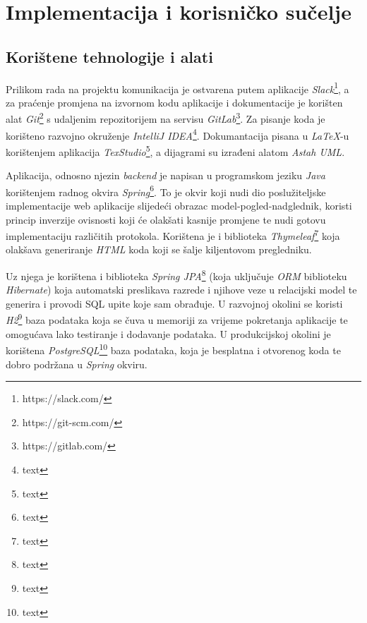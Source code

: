\chapter{Implementacija i korisničko sučelje}
		
		
		\section{Korištene tehnologije i alati}
%		
%			

		
		Prilikom rada na projektu komunikacija je ostvarena putem aplikacije \textit{Slack}\footnote{https://slack.com/}, a za praćenje promjena na izvornom kodu aplikacije i dokumentacije je korišten alat \textit{Git}\footnote{https://git-scm.com/} s udaljenim repozitorijem na servisu \textit{GitLab}\footnote{https://gitlab.com/}. Za pisanje koda je korišteno razvojno okruženje \textit{IntelliJ IDEA}\footnote{text}. Dokumantacija pisana u \textit{LaTeX}-u korištenjem aplikacija \textit{TexStudio}\footnote{text}, a dijagrami su izrađeni alatom \textit{Astah UML}.
		
		Aplikacija, odnosno njezin \textit{backend} je napisan u programskom jeziku \textit{Java} korištenjem radnog okvira \textit{Spring}\footnote{text}. To je okvir koji nudi dio poslužiteljske implementacije web aplikacije slijedeći obrazac model-pogled-nadglednik, koristi princip inverzije ovisnosti koji će olakšati kasnije promjene te nudi gotovu implementaciju različitih protokola. Korištena je i biblioteka \textit{Thymeleaf}\footnote{text} koja olakšava generiranje \textit{HTML} koda koji se šalje kiljentovom pregledniku.
		
		Uz njega je korištena i biblioteka \textit{Spring JPA}\footnote{text} (koja uključuje \textit{ORM} biblioteku \textit{Hibernate}) koja automatski preslikava razrede i njihove veze u relacijski model te generira i provodi SQL upite koje sam obrađuje. U razvojnoj okolini se koristi \textit{H2}\footnote{text} baza podataka koja se čuva u memoriji za vrijeme pokretanja aplikacije te omogućava lako testiranje i dodavanje podataka. U produkcijskoj okolini je korištena \textit{PostgreSQL}\footnote{text} baza podataka, koja je besplatna i otvorenog koda te dobro podržana u \textit{Spring} okviru.
		
